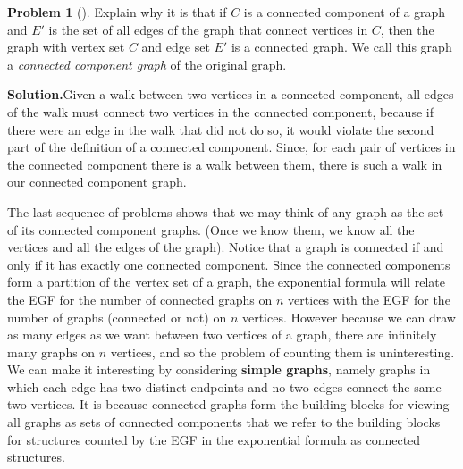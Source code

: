 \documentclass[10pt,]{book}
\newcommand{\terminology}[1]{\textbf{#1}}
\theoremstyle{plain}
\theoremstyle{definition}
\newtheorem{activity}[project]{Problem}
\theoremstyle{definition}
\numberwithin{equation}{chapter}
\begin{document}
\begin{activity}[]\label{activity-420}
Explain why it is that if \(C\) is a connected component of a graph and \(E'\) is the set of all edges of the graph that connect vertices in \(C\), then the graph with vertex set \(C\) and edge set \(E'\) is a connected graph. We call this graph a \emph{connected component graph} of the original graph.%
\par\medskip\noindent%
\textbf{Solution.}\quad Given a walk between two vertices in a connected component, all edges of the walk must connect two vertices in the connected component, because if there were an edge in the walk that did not do so, it would violate the second part of the definition of a connected component.  Since, for each pair of vertices in the connected component there is a walk between them, there is such a walk in our connected component graph.%
\end{activity}
The last sequence of problems shows that we may think of any graph as the set of its connected component graphs. (Once we know them, we know all the vertices and all the edges of the graph). Notice that a graph is connected if and only if it has exactly one connected component. Since the connected components form a partition of the vertex set of a graph, the exponential formula will relate the EGF for the number of connected graphs on \(n\) vertices with the EGF for the number of graphs (connected or not) on \(n\) vertices. However because we can draw as many edges as we want between two vertices of a graph, there are infinitely many graphs on \(n\) vertices, and so the problem of counting them is uninteresting. We can make it interesting by considering \terminology{simple graphs}, namely graphs in which each edge has two distinct endpoints and no two edges connect the same two vertices. It is because connected graphs form the building blocks for viewing all graphs as sets of connected components that we refer to the building blocks for structures counted by the EGF in the exponential formula as connected structures.%
\end{document}
